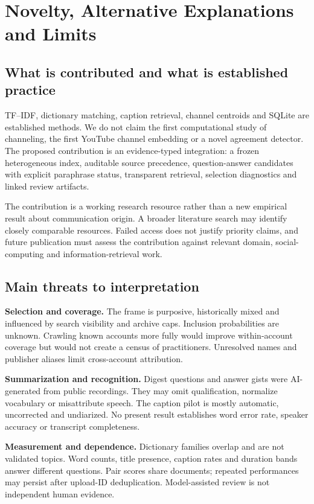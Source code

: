 \section{Novelty, Alternative Explanations and Limits}
\subsection{What is contributed and what is established practice}
TF--IDF, dictionary matching, caption retrieval, channel centroids and SQLite are established methods. We do not claim the first computational study of channeling, the first YouTube channel embedding or a novel agreement detector. The proposed contribution is an evidence-typed integration: a frozen heterogeneous index, auditable source precedence, question-answer candidates with explicit paraphrase status, transparent retrieval, selection diagnostics and linked review artifacts.

The contribution is a working research resource rather than a new empirical result about communication origin. A broader literature search may identify closely comparable resources. Failed access does not justify priority claims, and future publication must assess the contribution against relevant domain, social-computing and information-retrieval work.

\subsection{Main threats to interpretation}
\textbf{Selection and coverage.} The frame is purposive, historically mixed and influenced by search visibility and archive caps. Inclusion probabilities are unknown. Crawling known accounts more fully would improve within-account coverage but would not create a census of practitioners. Unresolved names and publisher aliases limit cross-account attribution.

\textbf{Summarization and recognition.} Digest questions and answer gists were AI-generated from public recordings. They may omit qualification, normalize vocabulary or misattribute speech. The caption pilot is mostly automatic, uncorrected and undiarized. No present result establishes word error rate, speaker accuracy or transcript completeness.

\textbf{Measurement and dependence.} Dictionary families overlap and are not validated topics. Word counts, title presence, caption rates and duration bands answer different questions. Pair scores share documents; repeated performances may persist after upload-ID deduplication. Model-assisted review is not independent human evidence.

